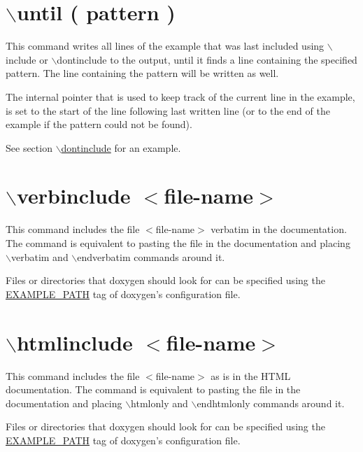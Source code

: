  \hypertarget{commands_cmduntil}{}\section{$\backslash$until ( pattern )}\label{commands_cmduntil}
 This command writes all lines of the example that was last included using $\backslash$include or $\backslash$dontinclude to the output, until it finds a line containing the specified pattern. The line containing the pattern will be written as well.

The internal pointer that is used to keep track of the current line in the example, is set to the start of the line following last written line (or to the end of the example if the pattern could not be found).

See section \hyperlink{commands_cmddontinclude}{$\backslash$dontinclude} for an example.



 \hypertarget{commands_cmdverbinclude}{}\section{$\backslash$verbinclude $<$file-name$>$}\label{commands_cmdverbinclude}
 This command includes the file $<$file-name$>$ verbatim in the documentation. The command is equivalent to pasting the file in the documentation and placing $\backslash$verbatim and $\backslash$endverbatim commands around it.

Files or directories that doxygen should look for can be specified using the \hyperlink{config_cfg_example_path}{EXAMPLE\_\-PATH} tag of doxygen's configuration file.



 \hypertarget{commands_cmdhtmlinclude}{}\section{$\backslash$htmlinclude $<$file-name$>$}\label{commands_cmdhtmlinclude}
 This command includes the file $<$file-name$>$ as is in the HTML documentation. The command is equivalent to pasting the file in the documentation and placing $\backslash$htmlonly and $\backslash$endhtmlonly commands around it.

Files or directories that doxygen should look for can be specified using the \hyperlink{config_cfg_example_path}{EXAMPLE\_\-PATH} tag of doxygen's configuration file.



